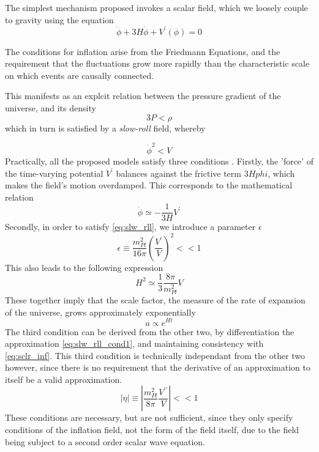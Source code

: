 The simplest mechanism proposed invokes a scalar field, which we loosely couple to gravity using the equation
\begin{equation}\label{eq:sclr_inf}
	\ddot{\phi} + 3 H \dot{\phi} + V^\prime(\phi) = 0
\end{equation}

The conditions for inflation arise from the Friedmann Equations, and the requirement that the fluctuations grow more rapidly than the characteristic scale on which events are causally connected.

This manifests as an explcit relation between the pressure gradient of the universe, and its density
\begin{equation}\label{eq:inf_cndtn}
	3 P < \rho
\end{equation}
which in turn is satisfied by a \emph{slow-roll} field, whereby

\begin{equation}\label{eq:slw_rll}
	\dot{\phi}^2 < V
\end{equation}
Practically, all the proposed models satisfy three conditions \cite{LiddleLyth:00}. Firstly, the 'force' of the time-varying potential $V^\prime$ balances against the frictive term $3 H \dot{phi}$, which makes the field's motion overdamped. This corresponds to the mathematical relation
\begin{equation}\label{eq:slw_rll_cond1}
	\dot{\phi} \simeq - \frac{1}{3 H} V^\prime
\end{equation}
Secondly, in order to satisfy \ref{eq:slw_rll}, we introduce a parameter $\epsilon$
\begin{equation}\label{eq:slw_rll_cond2}
	\epsilon \equiv \frac{m_{Pl}^2}{16 \pi} \left(\frac{V^\prime}{V}\right)^2 << 1
\end{equation}
This also leads to the following expression
$$ H^2 \simeq \frac{1}{3} \frac{8 \pi}{m_{Pl}^2} V $$
These together imply that the scale factor, the measure of the rate of expansion of the universe, grows approximately exponentially
$$a \propto e^{Ht} $$
The third condition can be derived from the other two, by differentiation the approximation \ref{eq:slw_rll_cond1}, and maintaining consistency with \ref{eq:sclr_inf}. This third condition is technically independant from the other two however, since there is no requirement that the derivative of an approximation to itself be a valid approximation.
\begin{equation}\label{eq:slw_rll_cond3}
	|\eta| \equiv \left| \frac{m_{Pl}^2}{8 \pi} \frac{V^{\prime \prime}}{V} \right| << 1
\end{equation}
These conditions are necessary, but are not sufficient, since they only specify conditions of the inflation field, not the form of the field itself, due to the field being subject to a second order scalar wave equation.

